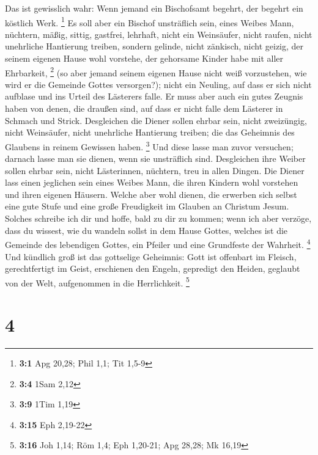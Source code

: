  Das ist gewisslich wahr: Wenn jemand ein Bischofsamt
begehrt, der begehrt ein köstlich Werk. \footnote{\textbf{3:1} Apg
  20,28; Phil 1,1; Tit 1,5-9}  Es soll aber ein Bischof
unsträflich sein, eines Weibes Mann, nüchtern, mäßig, sittig, gastfrei,
lehrhaft,  nicht ein Weinsäufer, nicht raufen, nicht
unehrliche Hantierung treiben, sondern gelinde, nicht zänkisch, nicht
geizig,  der seinem eigenen Hause wohl vorstehe, der
gehorsame Kinder habe mit aller Ehrbarkeit, \footnote{\textbf{3:4} 1Sam
  2,12}  (so aber jemand seinem eigenen Hause nicht weiß
vorzustehen, wie wird er die Gemeinde Gottes versorgen?); 
nicht ein Neuling, auf dass er sich nicht aufblase und ins Urteil des
Lästerers falle.  Er muss aber auch ein gutes Zeugnis
haben von denen, die draußen sind, auf dass er nicht falle dem Lästerer
in Schmach und Strick.  Desgleichen die Diener sollen
ehrbar sein, nicht zweizüngig, nicht Weinsäufer, nicht unehrliche
Hantierung treiben;  die das Geheimnis des Glaubens in
reinem Gewissen haben. \footnote{\textbf{3:9} 1Tim 1,19} 
Und diese lasse man zuvor versuchen; darnach lasse man sie dienen, wenn
sie unsträflich sind.  Desgleichen ihre Weiber sollen
ehrbar sein, nicht Lästerinnen, nüchtern, treu in allen Dingen.
 Die Diener lass einen jeglichen sein eines Weibes Mann,
die ihren Kindern wohl vorstehen und ihren eigenen Häusern.
 Welche aber wohl dienen, die erwerben sich selbst eine
gute Stufe und eine große Freudigkeit im Glauben an Christum Jesum.
 Solches schreibe ich dir und hoffe, bald zu dir zu
kommen;  wenn ich aber verzöge, dass du wissest, wie du
wandeln sollst in dem Hause Gottes, welches ist die Gemeinde des
lebendigen Gottes, ein Pfeiler und eine Grundfeste der Wahrheit.
\footnote{\textbf{3:15} Eph 2,19-22}  Und kündlich groß
ist das gottselige Geheimnis: Gott ist offenbart im Fleisch,
gerechtfertigt im Geist, erschienen den Engeln, gepredigt den Heiden,
geglaubt von der Welt, aufgenommen in die Herrlichkeit. \footnote{\textbf{3:16}
  Joh 1,14; Röm 1,4; Eph 1,20-21; Apg 28,28; Mk 16,19}

\hypertarget{section-3}{%
\section{4}\label{section-3}}

